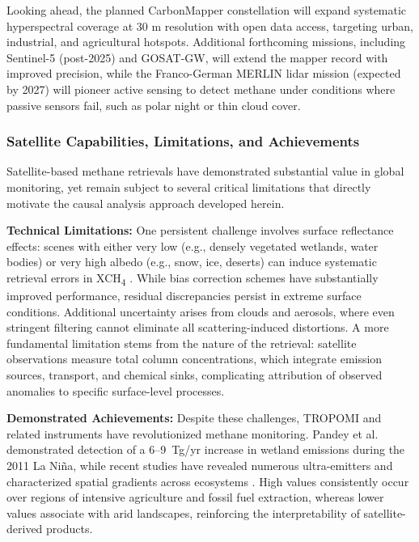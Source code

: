 Looking ahead, the planned CarbonMapper constellation will expand systematic hyperspectral coverage at 30 m resolution with open data access, targeting urban, industrial, and agricultural hotspots. Additional forthcoming missions, including Sentinel-5 (post-2025) and GOSAT-GW, will extend the mapper record with improved precision, while the Franco-German MERLIN lidar mission (expected by 2027) will pioneer active sensing to detect methane under conditions where passive sensors fail, such as polar night or thin cloud cover.

\subsubsection{Satellite Capabilities, Limitations, and Achievements}

Satellite-based methane retrievals have demonstrated substantial value in global monitoring, yet remain subject to several critical limitations that directly motivate the causal analysis approach developed herein.

\textbf{Technical Limitations:} One persistent challenge involves surface reflectance effects: scenes with either very low (e.g., densely vegetated wetlands, water bodies) or very high albedo (e.g., snow, ice, deserts) can induce systematic retrieval errors in XCH\textsubscript{4} \cite{Lorente2021}. While bias correction schemes have substantially improved performance, residual discrepancies persist in extreme surface conditions. Additional uncertainty arises from clouds and aerosols, where even stringent filtering cannot eliminate all scattering-induced distortions. A more fundamental limitation stems from the nature of the retrieval: satellite observations measure total column concentrations, which integrate emission sources, transport, and chemical sinks, complicating attribution of observed anomalies to specific surface-level processes.

\textbf{Demonstrated Achievements:} Despite these challenges, TROPOMI and related instruments have revolutionized methane monitoring. Pandey et al. \cite{Pandey2017} demonstrated detection of a 6--9~Tg/yr increase in wetland emissions during the 2011 La Niña, while recent studies have revealed numerous ultra-emitters and characterized spatial gradients across ecosystems \cite{Pandey2019, Lauvaux2022}. High values consistently occur over regions of intensive agriculture and fossil fuel extraction, whereas lower values associate with arid landscapes, reinforcing the interpretability of satellite-derived products.

